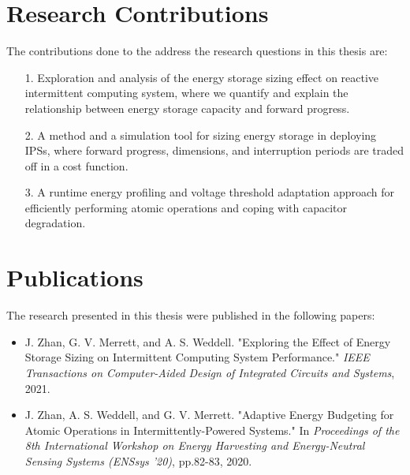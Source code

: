 \begin{enumerate}
  
\end{enumerate}

\section{Research Contributions}



The contributions done to the address the research questions in this thesis are:
\begin{itemize}
  \item[1.] Exploration and analysis of the energy storage sizing effect on reactive intermittent computing system, where we quantify and explain the relationship between energy storage capacity and forward progress.
  \item[2.] A method and a simulation tool for sizing energy storage in deploying IPSs, where forward progress, dimensions, and interruption periods are traded off in a cost function.
  \item[3.] A runtime energy profiling and voltage threshold adaptation approach for efficiently performing atomic operations and coping with capacitor degradation. 
\end{itemize}


\section{Publications}

The research presented in this thesis were published in the following papers:

\begin{itemize}
    \item J. Zhan, G. V. Merrett, and A. S. Weddell. "Exploring the Effect of Energy Storage Sizing on Intermittent Computing System Performance." \textit{IEEE Transactions on Computer-Aided Design of Integrated Circuits and Systems}, 2021.

    \item J. Zhan, A. S. Weddell, and G. V. Merrett. "Adaptive Energy Budgeting for Atomic Operations in Intermittently-Powered Systems." In \textit{Proceedings of the 8th International Workshop on Energy Harvesting and Energy-Neutral Sensing Systems (ENSsys '20)}, pp.82-83, 2020.
\end{itemize}


